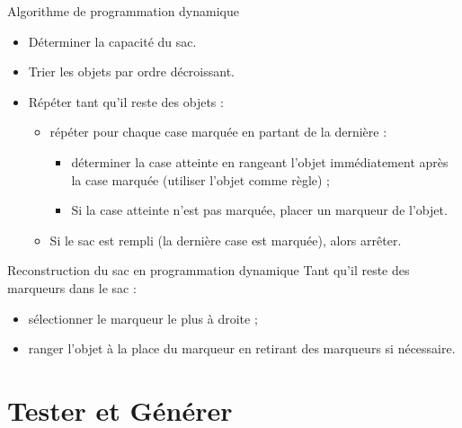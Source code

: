 \documentclass[11pt,a4paper]{article}
\begin{document}
  \begin{algorithme}{Algorithme de programmation dynamique}
    \label{algo-DP}

    \begin{itemize}
    \item Déterminer la capacité du sac.
    \item Trier les objets par ordre décroissant.
    \item  Répéter tant qu'il reste des objets :
      \begin{itemize}
      \item répéter pour chaque case marquée en partant de la dernière :
      \begin{itemize}
      \item déterminer la case atteinte en rangeant l'objet immédiatement après la case marquée (utiliser l'objet comme règle) ;
      \item Si la case atteinte n'est pas marquée, placer un marqueur de l'objet.
      \end{itemize}
    \item Si le sac est rempli (la dernière case est marquée), alors arrêter.
      \end{itemize}
    \end{itemize}
  \end{algorithme}

\begin{algorithme}{Reconstruction du sac en programmation dynamique}
  Tant qu'il reste des marqueurs dans le sac :
  \begin{itemize}
  \item sélectionner le marqueur le plus à droite ;
  \item ranger l'objet à la place du marqueur en retirant des marqueurs si nécessaire.
  \end{itemize}
  \end{algorithme}

  
  


  \section{Tester et Générer}
\end{document}
